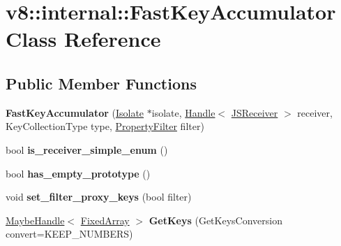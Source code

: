 \hypertarget{classv8_1_1internal_1_1_fast_key_accumulator}{}\section{v8\+:\+:internal\+:\+:Fast\+Key\+Accumulator Class Reference}
\label{classv8_1_1internal_1_1_fast_key_accumulator}
\subsection*{Public Member Functions}
\begin{DoxyCompactItemize}
\item 
{\bfseries Fast\+Key\+Accumulator} (\hyperlink{classv8_1_1internal_1_1_isolate}{Isolate} $\ast$isolate, \hyperlink{classv8_1_1internal_1_1_handle}{Handle}$<$ \hyperlink{classv8_1_1internal_1_1_j_s_receiver}{J\+S\+Receiver} $>$ receiver, Key\+Collection\+Type type, \hyperlink{namespacev8_afbf02b6b1152a3e25d7bde90798209ac}{Property\+Filter} filter)\hypertarget{classv8_1_1internal_1_1_fast_key_accumulator_a5728b76538dcde0e968c1ed143fdca84}{}\label{classv8_1_1internal_1_1_fast_key_accumulator_a5728b76538dcde0e968c1ed143fdca84}

\item 
bool {\bfseries is\+\_\+receiver\+\_\+simple\+\_\+enum} ()\hypertarget{classv8_1_1internal_1_1_fast_key_accumulator_ad3fa0ed0efd7162b94f434f78fbd0f53}{}\label{classv8_1_1internal_1_1_fast_key_accumulator_ad3fa0ed0efd7162b94f434f78fbd0f53}

\item 
bool {\bfseries has\+\_\+empty\+\_\+prototype} ()\hypertarget{classv8_1_1internal_1_1_fast_key_accumulator_a42ae93ef9c49f72046d4a82139f44ee5}{}\label{classv8_1_1internal_1_1_fast_key_accumulator_a42ae93ef9c49f72046d4a82139f44ee5}

\item 
void {\bfseries set\+\_\+filter\+\_\+proxy\+\_\+keys} (bool filter)\hypertarget{classv8_1_1internal_1_1_fast_key_accumulator_a02635f4ffa327e3520927b4db1602e17}{}\label{classv8_1_1internal_1_1_fast_key_accumulator_a02635f4ffa327e3520927b4db1602e17}

\item 
\hyperlink{classv8_1_1internal_1_1_maybe_handle}{Maybe\+Handle}$<$ \hyperlink{classv8_1_1internal_1_1_fixed_array}{Fixed\+Array} $>$ {\bfseries Get\+Keys} (Get\+Keys\+Conversion convert=K\+E\+E\+P\+\_\+\+N\+U\+M\+B\+E\+RS)\hypertarget{classv8_1_1internal_1_1_fast_key_accumulator_a51a58a1de23e902d0eafb27112dfe654}{}\label{classv8_1_1internal_1_1_fast_key_accumulator_a51a58a1de23e902d0eafb27112dfe654}

\end{DoxyCompactItemize}
